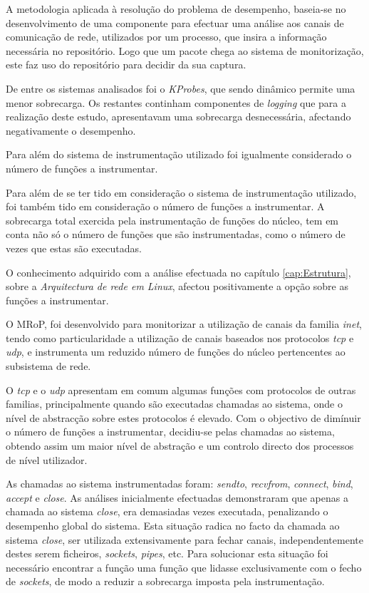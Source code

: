 
A metodologia aplicada à resolução do problema de desempenho, baseia-se no desenvolvimento de uma componente para efectuar uma análise aos canais de comunicação de rede, utilizados por um processo, que insira a informação necessária no repositório.
Logo que um pacote chega ao sistema de monitorização, este faz uso do repositório para decidir da sua captura.


De entre os sistemas analisados foi o \textit{KProbes}, que sendo dinâmico permite uma menor sobrecarga.
Os restantes continham componentes de \textit{logging} que para a realização deste estudo, apresentavam uma sobrecarga desnecessária, afectando negativamente o desempenho.

Para além do sistema de instrumentação utilizado foi igualmente considerado o número de funções a instrumentar.

Para além de se ter tido em consideração o sistema de instrumentação utilizado, foi também tido em consideração o número de funções a instrumentar.
A sobrecarga total exercida pela instrumentação de funções do núcleo, tem em conta não só o número de funções que são instrumentadas, como o número de vezes que estas são executadas.

O conhecimento adquirido com a análise efectuada no capítulo \ref{cap:Estrutura}, sobre a \textit{Arquitectura de rede em Linux}, afectou positivamente a opção sobre as funções a instrumentar.

O MRoP, foi desenvolvido para monitorizar a utilização de canais da familia \textit{inet}, tendo como particularidade a utilização de canais baseados nos protocolos \textit{tcp} e \textit{udp}, e instrumenta um reduzido número de funções do núcleo pertencentes ao subsistema de rede.

O \textit{tcp} e o \textit{udp} apresentam em comum algumas funções com protocolos de outras familias, principalmente quando são executadas chamadas ao sistema, onde o nível de abstracção sobre estes protocolos é elevado.
Com o objectivo de dimínuir o número de funções a instrumentar, decidiu-se pelas chamadas ao sistema, obtendo assim um maior nível de abstração e um controlo directo dos processos de nível utilizador.

As chamadas ao sistema instrumentadas foram: \textit{sendto}, \textit{recvfrom}, \textit{connect}, \textit{bind}, \textit{accept} e \textit{close}.
As análises inicialmente efectuadas demonstraram que apenas a chamada ao sistema \textit{close}, era demasiadas vezes executada, penalizando o desempenho global do sistema.
Esta situação radica no facto da chamada ao sistema \textit{close}, ser utilizada extensivamente para fechar canais, independentemente destes serem ficheiros, \textit{sockets}, \textit{pipes}, etc.
Para solucionar esta situação foi necessário encontrar a função uma função que lidasse exclusivamente com o fecho de \textit{sockets}, de modo a reduzir a sobrecarga imposta pela instrumentação.


